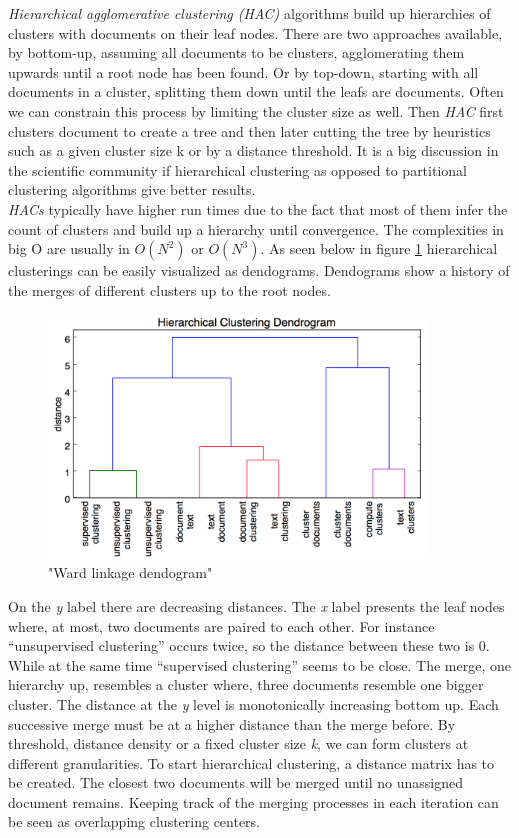     \emph{Hierarchical agglomerative clustering (HAC)} algorithms build up hierarchies of clusters with  documents on their leaf nodes. There are two approaches available, by bottom-up, assuming all documents to be clusters, agglomerating them upwards until a root node has been found. Or by top-down, starting with all documents in a cluster, splitting them down until the leafs are documents. Often we can constrain this process by limiting the cluster size as well. Then \emph{HAC} first clusters document to create a tree and then later cutting the tree by heuristics such as a given cluster size k or by a distance threshold. It is a big discussion in the scientific community if hierarchical clustering as opposed to partitional clustering algorithms give better results. \cite[chp. 17]{IRBook2008}\\
    \emph{HACs} typically have higher run times due to the fact that most of them infer the count of clusters and build up a hierarchy until convergence. The complexities in big O are usually in $O(N^2)$ or $O(N^3)$. As seen below in figure \ref{hac_dendogram} hierarchical clusterings can be easily visualized as dendograms. Dendograms show a history of the merges of different clusters up to the root nodes.

    \begin{figure}[h!]
      \centering
        \includegraphics[width=0.9\textwidth]{dendogram.png}
        \caption{"Ward linkage dendogram"}
        \label{hac_dendogram}
    \end{figure}

    On the \emph{y} label there are decreasing distances. The \emph{x} label presents the leaf nodes where, at most, two documents are paired to each other. For instance ``unsupervised clustering'' occurs twice, so the distance between these two is 0. While at the same time ``supervised clustering'' seems to be close. The merge, one hierarchy up, resembles a cluster where, three documents resemble one bigger cluster. The distance at the \emph{y} level is monotonically increasing bottom up. Each successive merge must be at a higher distance than the merge before. By threshold, distance density or a fixed cluster size \emph{k}, we can form clusters at different granularities. To start hierarchical clustering, a distance matrix has to be created. The closest two documents will be merged until no unassigned document remains. Keeping track of the merging processes in each iteration can be seen as overlapping clustering centers.\\

